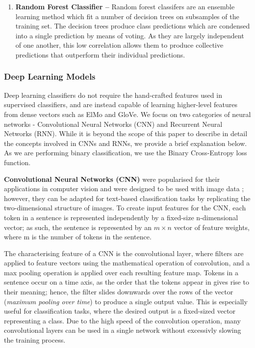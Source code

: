 \documentclass[12pt,a4paper]{article}
\begin{document}
\begin{enumerate}
	\item \textbf{Random Forest Classifier --}
	 Random forest classifers \cite{breiman2001random} are an ensemble learning method which fit a number of decision trees on subsamples of the training set. The decision trees produce class predictions which are condensed into a single prediction by means of voting. As they are largely independent of one another, this low correlation allows them to produce collective predictions that outperform their individual predictions.
\end{enumerate}


\subsubsection{Deep Learning Models}
Deep learning classifiers do not require the  hand-crafted features used in supervised classifiers, and are instead capable of learning higher-level features from dense vectors such as ElMo and GloVe. We focus on two categories of neural networks - Convolutional Neural Networks (CNN) and Recurrent Neural Networks (RNN). While it is beyond the scope of this paper to describe in detail the concepts involved in CNNs and RNNs, we provide a brief explanation below. As we are performing binary classification, we use the Binary Cross-Entropy loss function.\\\vspace{-5pt}

\noindent \textbf{Convolutional Neural Networks (CNN)}\cite{lecun1998gradient} were popularised for their applications in computer vision and were designed to be used with image data \cite{krizhevsky2012imagenet}; however, they can be adapted for text-based classification tasks by replicating the two-dimensional structure of images. To create input features for the CNN, each token in a sentence is represented independently by a fixed-size n-dimensional vector; as such, the sentence is represented by an $m \times n$ vector of feature weights, where m is the number of tokens in the sentence.

\noindent The characterising feature of a CNN is the convolutional layer, where filters are applied to feature vectors using the mathematical operation of convolution, and a max pooling operation is applied over each resulting feature map. Tokens in a sentence occur on a time axis, as the order that the tokens appear in gives rise to their meaning; hence, the filter slides downwards over the rows of the vector (\textit{maximum pooling over time}) to produce a single output value. This is especially useful for classification tasks, where the desired output is a fixed-sized vector representing a class. Due to the high speed of the convolution operation, many convolutional layers can be used in a single network without excessivly slowing the training process.
\end{document}
